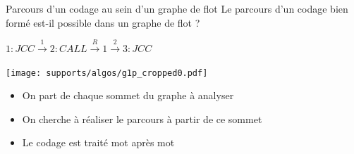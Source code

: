 \documentclass{beamer}
\begin{document}
\begin{frame}{Parcours d'un codage au sein d'un graphe de flot}
Le parcours d'un codage bien formé est-il possible dans un graphe de flot ?

\begin{minipage}{0.5\textwidth}
$1: JCC\xrightarrow{1} 2: CALL\xrightarrow{R} 1\xrightarrow{2} 3: JCC$%
\end{minipage}
\begin{minipage}{0.4\textwidth}
\begin{center}
\texttt{[image: supports/algos/g1p\_cropped0.pdf]}
\end{center}
\end{minipage}

\pause
\begin{itemize}
\item On part de chaque sommet du graphe à analyser
\item On cherche à réaliser le parcours à partir de ce sommet
\item Le codage est traité mot après mot
\end{itemize}

\end{frame}
\end{document}
